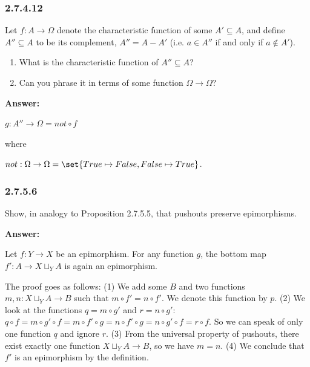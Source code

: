 \documentclass{article}
\newcommand{\vsp}[0]{\vspace*{10pt}\par}
\newcommand{\exercise}[1]{\subsubsection*{#1}}
\newcommand{\ans}[0]{\vsp\textbf{Answer: }\vsp}
\newcommand{\ei}{\item}
\newcommand{\eb}{\begin{enumerate}[label=(\alph*)]\ei}
\newcommand{\ee}{\end{enumerate}}
\begin{document}
\exercise{2.7.4.12}

Let $f: A \to \Omega$ denote the characteristic function of some $A' \subseteq A$, and
define $A'' \subseteq A$ to be its complement, $A'' = A - A'$ (i.e. $a \in A''$
if and only if $a \notin A'$).

\eb What is the characteristic function of $A'' \subseteq A$?
\ei Can you phrase it in terms of some function $\Omega \to \Omega$?
\ee

\ans

$g: A'' \to \Omega = not \circ f$

where

$not: \Omega \to \Omega = \set{True \mapsto False, False \mapsto True}$.

\exercise{2.7.5.6}

Show, in analogy to Proposition 2.7.5.5, that pushouts preserve epimorphisms.

\ans

Let $f: Y \to X$ be an epimorphism. For any function $g$, the bottom map $f':A
\to X \sqcup_Y A$ is again an epimorphism.

\begin{center}
\end{center}

The proof goes as follows:
(1) We add some $B$ and two functions $m,n: X \sqcup_Y A \to B$ such that $m
\circ f' = n \circ f'$. We denote this function by $p$. (2) We look at the
functions $q = m \circ g'$ and $r = n \circ g'$: $q \circ f = m \circ g' \circ f
= m \circ f' \circ g = n \circ f' \circ g = n \circ g' \circ f = r \circ f$. So
we can speak of only one function $q$ and ignore $r$. (3) From the universal
property of pushouts, there exist exactly one function $X \sqcup_Y A \to B$, so
we have $m = n$. (4) We conclude that $f'$ is an epimorphism by the definition.
\end{document}
